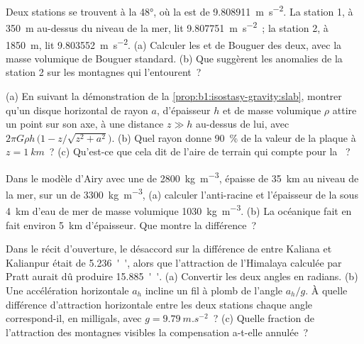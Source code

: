\begin{exercise}[$\star\star$]\label{exo:b1:isostasy-gravity:6}
Deux stations se trouvent à la  \ang{48}, où la  est de
\qty{9.808911}{m.s^{-2}}. La station 1, à \qty{350}{m} au-dessus du niveau de la mer, lit
\qty{9.807751}{m.s^{-2}}~; la station 2, à \qty{1850}{m}, lit
\qty{9.803552}{m.s^{-2}}. (a) Calculer les  et de Bouguer des
deux, avec la masse volumique de Bouguer standard. (b) Que suggèrent les anomalies de la
station 2 sur les montagnes qui l'entourent~?
\end{exercise}

\begin{exercise}[$\star\star$]\label{exo:b1:isostasy-gravity:7}
(a) En suivant la démonstration de la \cref{prop:b1:isostasy-gravity:slab}, montrer
qu'un disque horizontal de rayon $a$, d'épaisseur $h$ et de masse volumique $\rho$ attire un point
sur son axe, à une distance $z \gg h$ au-dessus de lui, avec $2\pi G\rho h\,\bigl(1 -
z/\sqrt{z^2 + a^2}\bigr)$. (b) Quel rayon donne \qty{90}{\percent} de la valeur de
la plaque à $z = \qty{1}{km}$~? (c) Qu'est-ce que cela dit de l'aire de terrain
qui compte pour la ~?
\end{exercise}

\begin{exercise}[$\star\star$]\label{exo:b1:isostasy-gravity:8}
Dans le modèle d'Airy avec une  de \qty{2800}{kg.m^{-3}}, épaisse de \qty{35}{km} au niveau de la
mer, sur un  de \qty{3300}{kg.m^{-3}}, (a) calculer l'anti-racine et
l'épaisseur de la  sous \qty{4}{km} d'eau de mer de masse volumique \qty{1030}{kg.m^{-3}}.
(b) La  océanique fait en fait environ \qty{5}{km} d'épaisseur. Que montre la
différence~? %
\end{exercise}

\begin{exercise}[$\star\star$]\label{exo:b1:isostasy-gravity:9}
Dans le récit d'ouverture, le désaccord sur la différence de 
entre Kaliana et Kalianpur était de \qty{5.236}{''}, alors que l'attraction de
l'Himalaya calculée par Pratt aurait dû produire \qty{15.885}{''}. (a) Convertir
les deux angles en radians. (b) Une accélération horizontale $a_h$ incline un fil à plomb de
l'angle $a_h/g$. À quelle différence d'attraction horizontale entre les deux
stations chaque angle correspond-il, en milligals, avec
$g = \qty{9.79}{m.s^{-2}}$~? (c) Quelle fraction de l'attraction des
montagnes visibles la compensation a-t-elle annulée~?
\end{exercise}

